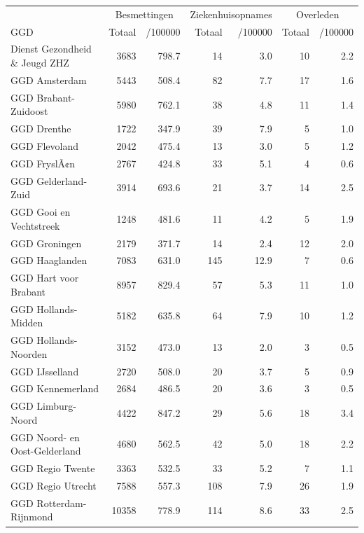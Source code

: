 \documentclass[
  english,
  man,floatsintext]{apa6}
\begin{document}
\begin{table}
\centering\begingroup\fontsize{10}{12}\selectfont

\begin{threeparttable}
\begin{tabular}{lrrrrrr}
\toprule
\multicolumn{1}{c}{ } & \multicolumn{2}{c}{Besmettingen} & \multicolumn{2}{c}{Ziekenhuisopnames} & \multicolumn{2}{c}{Overleden} \\
\cmidrule(l{3pt}r{3pt}){2-3} \cmidrule(l{3pt}r{3pt}){4-5} \cmidrule(l{3pt}r{3pt}){6-7}
GGD & Totaal & /100000 & Totaal & /100000 & Totaal & /100000\\
\midrule
Dienst Gezondheid \& Jeugd ZHZ & 3683 & 798.7 & 14 & 3.0 & 10 & 2.2\\
GGD Amsterdam & 5443 & 508.4 & 82 & 7.7 & 17 & 1.6\\
GGD Brabant-Zuidoost & 5980 & 762.1 & 38 & 4.8 & 11 & 1.4\\
GGD Drenthe & 1722 & 347.9 & 39 & 7.9 & 5 & 1.0\\
GGD Flevoland & 2042 & 475.4 & 13 & 3.0 & 5 & 1.2\\
GGD FryslÃ¢n & 2767 & 424.8 & 33 & 5.1 & 4 & 0.6\\
GGD Gelderland-Zuid & 3914 & 693.6 & 21 & 3.7 & 14 & 2.5\\
GGD Gooi en Vechtstreek & 1248 & 481.6 & 11 & 4.2 & 5 & 1.9\\
GGD Groningen & 2179 & 371.7 & 14 & 2.4 & 12 & 2.0\\
GGD Haaglanden & 7083 & 631.0 & 145 & 12.9 & 7 & 0.6\\
GGD Hart voor Brabant & 8957 & 829.4 & 57 & 5.3 & 11 & 1.0\\
GGD Hollands-Midden & 5182 & 635.8 & 64 & 7.9 & 10 & 1.2\\
GGD Hollands-Noorden & 3152 & 473.0 & 13 & 2.0 & 3 & 0.5\\
GGD IJsselland & 2720 & 508.0 & 20 & 3.7 & 5 & 0.9\\
GGD Kennemerland & 2684 & 486.5 & 20 & 3.6 & 3 & 0.5\\
GGD Limburg-Noord & 4422 & 847.2 & 29 & 5.6 & 18 & 3.4\\
GGD Noord- en Oost-Gelderland & 4680 & 562.5 & 42 & 5.0 & 18 & 2.2\\
GGD Regio Twente & 3363 & 532.5 & 33 & 5.2 & 7 & 1.1\\
GGD Regio Utrecht & 7588 & 557.3 & 108 & 7.9 & 26 & 1.9\\
GGD Rotterdam-Rijnmond & 10358 & 778.9 & 114 & 8.6 & 33 & 2.5\\

\end{tabular}
\end{threeparttable}
\end{table}
\end{document}
